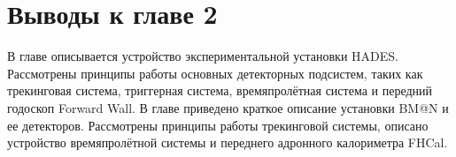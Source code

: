 \section{Выводы к главе 2}

В главе описывается устройство экспериментальной установки HADES. 
Рассмотрены принципы работы основных детекторных подсистем, таких как трекинговая система, триггерная система, времяпролётная система и передний годоскоп Forward Wall.
В главе приведено краткое описание установки BM@N и ее детекторов.
Рассмотрены принципы работы трекинговой системы, описано устройство времяпролётной системы и переднего адронного калориметра FHCal.
